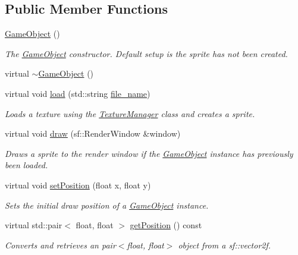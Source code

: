 \subsection*{Public Member Functions}
\begin{DoxyCompactItemize}
\item 
\hyperlink{class_game_object_a0348e3ee2e83d56eafca7a3547f432c4}{Game\+Object} ()
\begin{DoxyCompactList}\small\item\em The \hyperlink{class_game_object}{Game\+Object} constructor. Default setup is the sprite has not been created. \end{DoxyCompactList}\item 
virtual \hyperlink{class_game_object_a224d4f6d9dd75c8a6f9d022eaf586fd9}{$\sim$\+Game\+Object} ()
\item 
virtual void \hyperlink{class_game_object_acc593e5b75a58c4a59ad59da654ce807}{load} (std\+::string \hyperlink{class_game_object_a1b725daa9c79833a7139469468dc770a}{file\+\_\+name})
\begin{DoxyCompactList}\small\item\em Loads a texture using the \hyperlink{class_texture_manager}{Texture\+Manager} class and creates a sprite. \end{DoxyCompactList}\item 
virtual void \hyperlink{class_game_object_abf4de46e52c8f23d18d51bc29744b136}{draw} (sf\+::\+Render\+Window \&window)
\begin{DoxyCompactList}\small\item\em Draws a sprite to the render window if the \hyperlink{class_game_object}{Game\+Object} instance has previously been loaded. \end{DoxyCompactList}\item 
virtual void \hyperlink{class_game_object_a180d6e9e7afa44b30ca678a95c6f4dad}{set\+Position} (float x, float y)
\begin{DoxyCompactList}\small\item\em Sets the initial draw position of a \hyperlink{class_game_object}{Game\+Object} instance. \end{DoxyCompactList}\item 
virtual std\+::pair$<$ float, float $>$ \hyperlink{class_game_object_ad568496dd9cee5b9edd9357d30a00dff}{get\+Position} () const 
\begin{DoxyCompactList}\small\item\em Converts and retrieves an pair$<$float, float$>$ object from a sf\+::vector2f. \end{DoxyCompactList}\item 

\end{DoxyCompactItemize}
